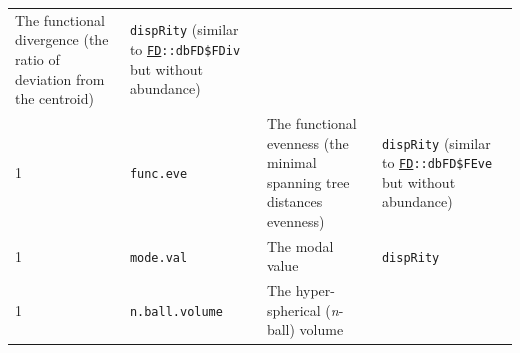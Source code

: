 \documentclass[]{book}
\begin{document}
\begin{longtable}[]{@{}llll@{}}
\begin{minipage}[t]{0.64\columnwidth}
The functional divergence (the ratio of deviation from the centroid)\strut
\end{minipage} & \begin{minipage}[t]{0.10\columnwidth}\raggedright
\texttt{dispRity} (similar to \href{https://cran.r-project.org/web/packages/FD/index.html}{\texttt{FD}}\texttt{::dbFD\$FDiv} but without abundance)\strut
\end{minipage}\tabularnewline
\begin{minipage}[t]{0.07\columnwidth}\raggedright
1\strut
\end{minipage} & \begin{minipage}[t]{0.07\columnwidth}\raggedright
\texttt{func.eve}\strut
\end{minipage} & \begin{minipage}[t]{0.64\columnwidth}\raggedright
The functional evenness (the minimal spanning tree distances evenness)\strut
\end{minipage} & \begin{minipage}[t]{0.10\columnwidth}\raggedright
\texttt{dispRity} (similar to \href{https://cran.r-project.org/web/packages/FD/index.html}{\texttt{FD}}\texttt{::dbFD\$FEve} but without abundance)\strut
\end{minipage}\tabularnewline
\begin{minipage}[t]{0.07\columnwidth}\raggedright
1\strut
\end{minipage} & \begin{minipage}[t]{0.07\columnwidth}\raggedright
\texttt{mode.val}\strut
\end{minipage} & \begin{minipage}[t]{0.64\columnwidth}\raggedright
The modal value\strut
\end{minipage} & \begin{minipage}[t]{0.10\columnwidth}\raggedright
\texttt{dispRity}\strut
\end{minipage}\tabularnewline
\begin{minipage}[t]{0.07\columnwidth}\raggedright
1\strut
\end{minipage} & \begin{minipage}[t]{0.07\columnwidth}\raggedright
\texttt{n.ball.volume}\strut
\end{minipage} & \begin{minipage}[t]{0.64\columnwidth}\raggedright
The hyper-spherical (\emph{n}-ball) volume\strut
\end{minipage} & \begin{minipage}[t]{0.10\columnwidth}\raggedright

\end{minipage}
\end{longtable}
\end{document}
